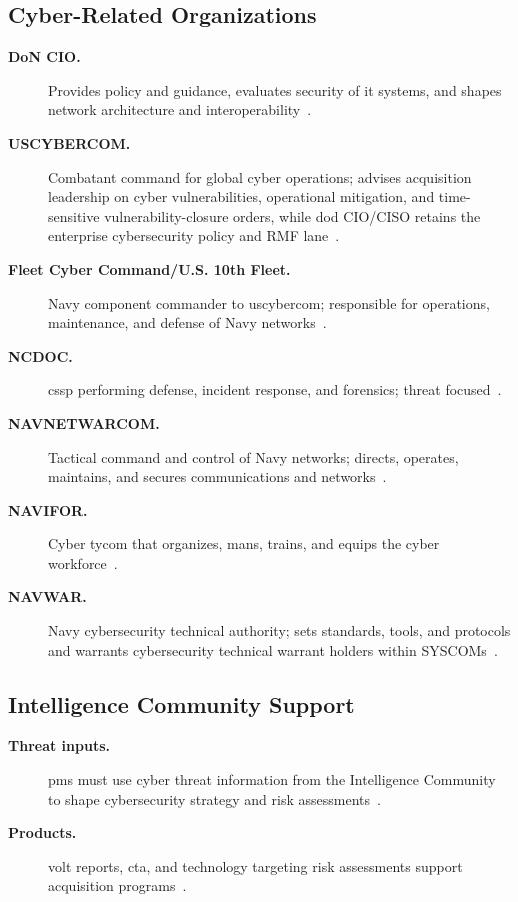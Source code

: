 \documentclass[../main.tex]{subfiles}
\begin{document}
\subsection{Cyber-Related Organizations}
\begin{description}
  \item[\textbf{DoN CIO.}] Provides policy and guidance, evaluates security of \ac{it} systems, and shapes network architecture and interoperability~\autocite{edo-3-4-3-cybersecurity-awareness-2025}.
  \item[\textbf{USCYBERCOM.}] Combatant command for global cyber operations; advises acquisition leadership on cyber vulnerabilities, operational mitigation, and time-sensitive vulnerability-closure orders, while \ac{dod} CIO/CISO retains the enterprise cybersecurity policy and RMF lane~\autocite{DoDI5000-90,DoDI8510-01,edo-3-4-3-cybersecurity-awareness-2025}.
  \item[\textbf{Fleet Cyber Command/U.S. 10th Fleet.}] Navy component commander to \ac{uscybercom}; responsible for operations, maintenance, and defense of Navy networks~\autocite{edo-3-4-3-cybersecurity-awareness-2025}.
  \item[\textbf{NCDOC.}] \ac{cssp} performing defense, incident response, and forensics; threat focused~\autocite{edo-3-4-3-cybersecurity-awareness-2025}.
  \item[\textbf{NAVNETWARCOM.}] Tactical command and control of Navy networks; directs, operates, maintains, and secures communications and networks~\autocite{edo-3-4-3-cybersecurity-awareness-2025}.
  \item[\textbf{NAVIFOR.}] Cyber \ac{tycom} that organizes, mans, trains, and equips the cyber workforce~\autocite{edo-3-4-3-cybersecurity-awareness-2025}.
  \item[\textbf{NAVWAR.}] Navy cybersecurity technical authority; sets standards, tools, and protocols and warrants cybersecurity technical warrant holders within SYSCOMs~\autocite{edo-3-4-3-cybersecurity-awareness-2025}.
\end{description}

\subsection{Intelligence Community Support}
\begin{description}
  \item[\textbf{Threat inputs.}] \acp{pm} must use cyber threat information from the Intelligence Community to shape cybersecurity strategy and risk assessments~\autocite{edo-3-4-3-cybersecurity-awareness-2025}.
  \item[\textbf{Products.}] \ac{volt} reports, \ac{cta}, and technology targeting risk assessments support acquisition programs~\autocite{edo-3-4-3-cybersecurity-awareness-2025}.
\end{description}
\end{document}
